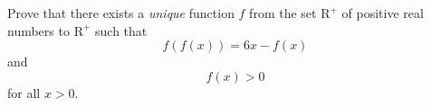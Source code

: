 Prove that there exists a \emph{unique} function $f$ from the set
$\mathrm{R}^+$ of positive real numbers to $\mathrm{R}^+$ such that
\[
f(f(x)) = 6x-f(x)
\]
and
\[
f(x)>0
\]
for all $x>0$.
